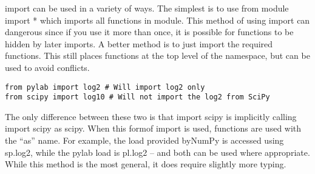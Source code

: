 \documentclass[11pt]{article} %
\begin{document}
import can be used in a variety of ways. The simplest is to use from module import * which imports
all functions in module. This method of using import can dangerous since if you use it more than once,
it is possible for functions to be hidden by later imports. A better method is to just import the required
functions. This still places functions at the top level of the namespace, but can be used to avoid conflicts.
\begin{verbatim}
from pylab import log2 # Will import log2 only
from scipy import log10 # Will not import the log2 from SciPy
\end{verbatim}

The only difference between these two is that import scipy is implicitly calling import scipy as scipy.
When this formof import is used, functions are used with the “as” name. For example, the load provided
byNumPy is accessed using sp.log2, while the pylab load is pl.log2 – and both can be used where appropriate.
While this method is the most general, it does require slightly more typing.
\end{document}
